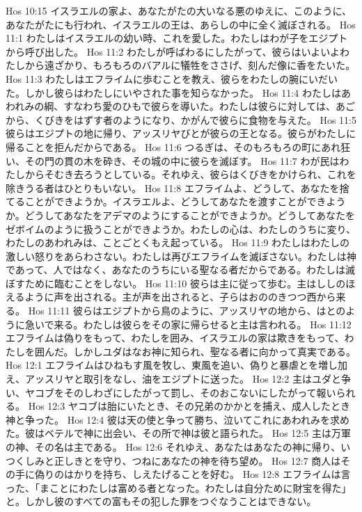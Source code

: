 Hos 10:15  イスラエルの家よ、あなたがたの大いなる悪のゆえに、このように、あなたがたにも行われ、イスラエルの王は、あらしの中に全く滅ぼされる。
Hos 11:1  わたしはイスラエルの幼い時、これを愛した。わたしはわが子をエジプトから呼び出した。
Hos 11:2  わたしが呼ばわるにしたがって、彼らはいよいよわたしから遠ざかり、もろもろのバアルに犠牲をささげ、刻んだ像に香をたいた。
Hos 11:3  わたしはエフライムに歩むことを教え、彼らをわたしの腕にいだいた。しかし彼らはわたしにいやされた事を知らなかった。
Hos 11:4  わたしはあわれみの綱、すなわち愛のひもで彼らを導いた。わたしは彼らに対しては、あごから、くびきをはずす者のようになり、かがんで彼らに食物を与えた。
Hos 11:5  彼らはエジプトの地に帰り、アッスリヤびとが彼らの王となる。彼らがわたしに帰ることを拒んだからである。
Hos 11:6  つるぎは、そのもろもろの町にあれ狂い、その門の貫の木を砕き、その城の中に彼らを滅ぼす。
Hos 11:7  わが民はわたしからそむき去ろうとしている。それゆえ、彼らはくびきをかけられ、これを除きうる者はひとりもいない。
Hos 11:8  エフライムよ、どうして、あなたを捨てることができようか。イスラエルよ、どうしてあなたを渡すことができようか。どうしてあなたをアデマのようにすることができようか。どうしてあなたをゼボイムのように扱うことができようか。わたしの心は、わたしのうちに変り、わたしのあわれみは、ことごとくもえ起っている。
Hos 11:9  わたしはわたしの激しい怒りをあらわさない。わたしは再びエフライムを滅ぼさない。わたしは神であって、人ではなく、あなたのうちにいる聖なる者だからである。わたしは滅ぼすために臨むことをしない。
Hos 11:10  彼らは主に従って歩む。主はししのほえるように声を出される。主が声を出されると、子らはおののきつつ西から来る。
Hos 11:11  彼らはエジプトから鳥のように、アッスリヤの地から、はとのように急いで来る。わたしは彼らをその家に帰らせると主は言われる。
Hos 11:12  エフライムは偽りをもって、わたしを囲み、イスラエルの家は欺きをもって、わたしを囲んだ。しかしユダはなお神に知られ、聖なる者に向かって真実である。
Hos 12:1  エフライムはひねもす風を牧し、東風を追い、偽りと暴虐とを増し加え、アッスリヤと取引をなし、油をエジプトに送った。
Hos 12:2  主はユダと争い、ヤコブをそのしわざにしたがって罰し、そのおこないにしたがって報いられる。
Hos 12:3  ヤコブは胎にいたとき、その兄弟のかかとを捕え、成人したとき神と争った。
Hos 12:4  彼は天の使と争って勝ち、泣いてこれにあわれみを求めた。彼はベテルで神に出会い、その所で神は彼と語られた。
Hos 12:5  主は万軍の神、その名は主である。
Hos 12:6  それゆえ、あなたはあなたの神に帰り、いつくしみと正しきとを守り、つねにあなたの神を待ち望め。
Hos 12:7  商人はその手に偽りのはかりを持ち、しえたげることを好む。
Hos 12:8  エフライムは言った、「まことにわたしは富める者となった。わたしは自分ために財宝を得た」と。しかし彼のすべての富もその犯した罪をつぐなうことはできない。
